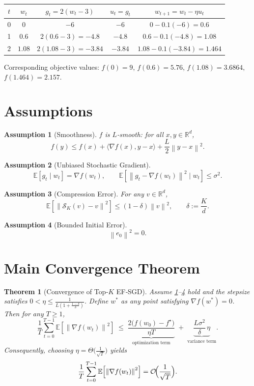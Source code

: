 \documentclass{article}
\newtheorem{theorem}{Theorem}
\newtheorem{assumption}{Assumption}
\newcommand{\E}{\mathbb{E}}
\newcommand{\R}{\mathbb{R}}
\newcommand{\norm}[1]{\left\|#1\right\|}
\newcommand{\topk}[2]{\mathcal{S}_{#1}(#2)} %
\begin{document}
\begin{center}
\begin{tabular}{c|c|c|c|c}
$t$ & $w_{t}$ & $g_{t}=2(w_{t}-3)$ & $u_{t}=g_{t}$ & $w_{t+1}=w_{t}-\eta u_{t}$\\ \hline
0 & $0$ & $-6$ & $-6$ & $0-0.1(-6)=0.6$\\
1 & $0.6$ & $2(0.6-3)=-4.8$ & $-4.8$ & $0.6-0.1(-4.8)=1.08$\\
2 & $1.08$ & $2(1.08-3)=-3.84$ & $-3.84$ & $1.08-0.1(-3.84)=1.464$\\
\end{tabular}
\end{center}
Corresponding objective values: $f(0)=9$, $f(0.6)=5.76$, $f(1.08)=3.6864$, $f(1.464)=2.157$.

\section*{Assumptions}
\begin{assumption}[Smoothness]\label{ass:smooth}
$f$ is $L$‑smooth: for all $x,y\in\R^{d}$,
\[
f(y)\le f(x)+\langle\nabla f(x),y-x\rangle+\frac{L}{2}\norm{y-x}^{2}.
\]
\end{assumption}
\begin{assumption}[Unbiased Stochastic Gradient]\label{ass:unbiased}
\[
\E\!\left[g_{t}\mid w_{t}\right]=\nabla f(w_{t}),\qquad 
\E\!\left[\norm{g_{t}-\nabla f(w_{t})}^{2}\mid w_{t}\right]\le\sigma^{2}.
\]
\end{assumption}
\begin{assumption}[Compression Error]\label{ass:compress}
For any $v\in\R^{d}$,
\[
\E\!\left[\norm{\topk{K}{v}-v}^{2}\right]\le (1-\delta)\norm{v}^{2},
\qquad\delta:=\frac{K}{d}.
\]
\end{assumption}
\begin{assumption}[Bounded Initial Error]\label{ass:init}
\[
\norm{e_{0}}^{2}=0.
\]
\end{assumption}

\section*{Main Convergence Theorem}
\begin{theorem}[Convergence of Top‑$K$ EF‑SGD]\label{thm:main}
Assume \ref{ass:smooth}–\ref{ass:init} hold and the stepsize satisfies $0<\eta\le\frac{1}{L(1+\frac{1-\delta}{\delta})}$.  
Define $w^{*}$ as any point satisfying $\nabla f(w^{*})=0$. Then for any $T\ge1$,
\[
\frac{1}{T}\sum_{t=0}^{T-1}\E\!\left[\norm{\nabla f(w_{t})}^{2}\right]
\;\le\;
\underbrace{\frac{2\bigl(f(w_{0})-f^{\star}\bigr)}{\eta T}}_{\text{optimization term}}
\;+\;
\underbrace{\frac{L\sigma^{2}}{\delta}\,\eta}_{\text{variance term}}.
\]
Consequently, choosing $\eta=\Theta\!\bigl(\frac{1}{\sqrt{T}}\bigr)$ yields
\[
\frac{1}{T}\sum_{t=0}^{T-1}\E\!\left[\norm{\nabla f(w_{t})}^{2}\right]=\mathcal{O}\!\Bigl(\frac{1}{\sqrt{T}}\Bigr).
\]
\end{theorem}
\end{document}
